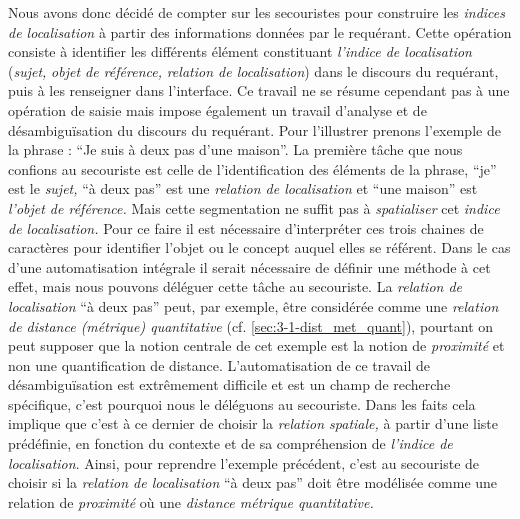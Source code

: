 Nous avons donc décidé de compter sur les secouristes pour construire
les \emph{indices de localisation} à partir des informations données
par le requérant. Cette opération consiste à identifier les différents
élément constituant \emph{l'indice de localisation} (\emph{sujet,}
\emph{objet de référence,} \emph{relation de localisation}) dans le
discours du requérant, puis à les renseigner dans l'interface. Ce
travail ne se résume cependant pas à une opération de saisie mais
impose également un travail d'analyse et de désambiguïsation du
discours du requérant. Pour l'illustrer prenons l'exemple de la phrase
: \enquote{Je suis à deux pas d'une maison}. La première tâche que
nous confions au secouriste est celle de l'identification des éléments
de la phrase, \enquote{je} est le \emph{sujet,} \enquote{à deux pas}
est une \emph{relation de localisation} et \enquote{une maison} est
\emph{l'objet de référence.} Mais cette segmentation ne suffit pas à
\emph{spatialiser} cet \emph{indice de localisation.} Pour ce faire il
est nécessaire d'interpréter ces trois chaines de caractères pour
identifier l'objet ou le concept auquel elles se référent. Dans le cas
d'une automatisation intégrale il serait nécessaire de définir une
méthode à cet effet, mais nous pouvons déléguer cette tâche au
secouriste. La \emph{relation de localisation} \enquote{à deux pas}
peut, par exemple, être considérée comme une \emph{relation de
  distance (métrique) quantitative}
(cf. \ref{sec:3-1-dist_met_quant}), pourtant on peut supposer que la
notion centrale de cet exemple est la notion de \emph{proximité} et
non une quantification de distance. L'automatisation de ce travail de
désambiguïsation est extrêmement difficile et est un champ de
recherche spécifique, c'est pourquoi nous le déléguons au
secouriste. Dans les faits cela implique que c'est à ce dernier de
choisir la \emph{relation spatiale,} à partir d'une liste prédéfinie,
en fonction du contexte et de sa compréhension de \emph{l'indice de
  localisation}. Ainsi, pour reprendre l'exemple précédent, c'est au
secouriste de choisir si la \emph{relation de localisation} \enquote{à
  deux pas} doit être modélisée comme une relation de \emph{proximité}
où une \emph{distance métrique quantitative.}

